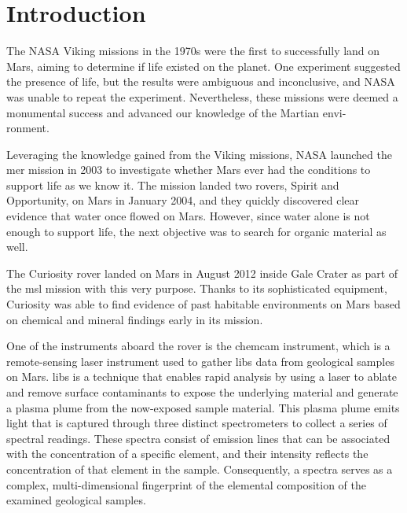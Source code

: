 \section{Introduction}\label{sec:introduction}
The NASA Viking missions in the 1970s were the first to successfully land on Mars, aiming to determine if life existed on the planet.
One experiment suggested the presence of life, but the results were ambiguous and inconclusive, and NASA was unable to repeat the experiment.
Nevertheless, these missions were deemed a monumental success and advanced our knowledge of the Martian envi-\\ronment.\cite{marsnasagov_vikings}

Leveraging the knowledge gained from the Viking missions, NASA launched the \gls{mer} mission in 2003 to investigate whether Mars ever had the conditions to support life as we know it.
The mission landed two rovers, Spirit and Opportunity, on Mars in January 2004, and they quickly discovered clear evidence that water once flowed on Mars.
However, since water alone is not enough to support life, the next objective was to search for organic material as well.\cite{marsnasagov_observer, marsnasagov_spirit_opportunity}

The Curiosity rover landed on Mars in August 2012 inside Gale Crater as part of the \gls{msl} mission with this very purpose.
Thanks to its sophisticated equipment, Curiosity was able to find evidence of past habitable environments on Mars based on chemical and mineral findings early in its mission.\cite{marsnasagov_chemcam}

One of the instruments aboard the rover is the \gls{chemcam} instrument, which is a remote-sensing laser instrument used to gather \gls{libs} data from geological samples on Mars.
\gls{libs} is a technique that enables rapid analysis by using a laser to ablate and remove surface contaminants to expose the underlying material and generate a plasma plume from the now-exposed sample material\cite{wiensChemcam2012}.
This plasma plume emits light that is captured through three distinct spectrometers to collect a series of spectral readings.
These spectra consist of emission lines that can be associated with the concentration of a specific element, and their intensity reflects the concentration of that element in the sample.
Consequently, a spectra serves as a complex, multi-dimensional fingerprint of the elemental composition of the examined geological samples.\cite{cleggRecalibrationMarsScience2017}

